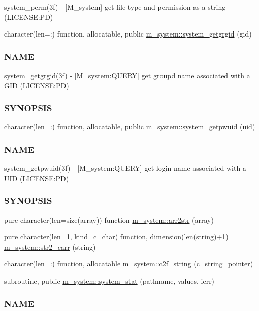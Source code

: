 \begin{DoxyCompactItemize}
\begin{DoxyCompactList}
system\+\_\+perm(3f) -\/ \mbox{[}M\+\_\+system\mbox{]} get file type and permission as a string (L\+I\+C\+E\+N\+SE\+:PD) \end{DoxyCompactList}\item 
character(len=\+:) function, allocatable, public \mbox{\hyperlink{namespacem__system_aec137429fbb8c848db4ecd914466d7e8}{m\+\_\+system\+::system\+\_\+getgrgid}} (gid)
\begin{DoxyCompactList}\small\item\em \subsubsection*{N\+A\+ME}

system\+\_\+getgrgid(3f) -\/ \mbox{[}M\+\_\+system\+:Q\+U\+E\+RY\mbox{]} get groupd name associated with a G\+ID (L\+I\+C\+E\+N\+SE\+:PD) \subsubsection*{S\+Y\+N\+O\+P\+S\+IS}\end{DoxyCompactList}\item 
character(len=\+:) function, allocatable, public \mbox{\hyperlink{namespacem__system_a59cd13de95dc9a65b444f02614ea39ce}{m\+\_\+system\+::system\+\_\+getpwuid}} (uid)
\begin{DoxyCompactList}\small\item\em \subsubsection*{N\+A\+ME}

system\+\_\+getpwuid(3f) -\/ \mbox{[}M\+\_\+system\+:Q\+U\+E\+RY\mbox{]} get login name associated with a U\+ID (L\+I\+C\+E\+N\+SE\+:PD) \subsubsection*{S\+Y\+N\+O\+P\+S\+IS}\end{DoxyCompactList}\item 
pure character(len=size(array)) function \mbox{\hyperlink{namespacem__system_aeb3d7d4cb39d59917910a3ae2532206d}{m\+\_\+system\+::arr2str}} (array)
\item 
pure character(len=1, kind=c\+\_\+char) function, dimension(len(string)+1) \mbox{\hyperlink{namespacem__system_a58bb591b5b9fefec3960a28361aae07a}{m\+\_\+system\+::str2\+\_\+carr}} (string)
\item 
character(len=\+:) function, allocatable \mbox{\hyperlink{namespacem__system_aa7c5445619aa15cd2301fe17f7c3b73c}{m\+\_\+system\+::c2f\+\_\+string}} (c\+\_\+string\+\_\+pointer)
\item 
subroutine, public \mbox{\hyperlink{namespacem__system_a5bb1ebcebe181e07fd24e908cacc9887}{m\+\_\+system\+::system\+\_\+stat}} (pathname, values, ierr)
\begin{DoxyCompactList}\small\item\em \subsubsection*{N\+A\+ME}


\end{DoxyCompactList}
\end{DoxyCompactItemize}

